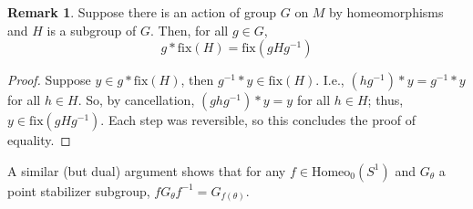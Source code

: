 \documentclass[10pt, oneside]{article}
\newcommand{\homeoS}{\text{Homeo}_0(S^1)}
\theoremstyle{definition}
\newtheorem{rem}{Remark}[section]
\theoremstyle{definition}
\begin{document}
\begin{rem}
    Suppose there is an action of group $G$ on $M$ by homeomorphisms and $H$ is a subgroup of $G$. Then, for all $g\in G$,
    $$g * \text{fix}(H) = \text{fix}(g H g^{-1})$$
\end{rem}
\begin{proof}
    Suppose $y\in g * \text{fix}(H)$, then $g^{-1}*y\in \text{fix}(H)$. I.e., $(hg^{-1})*y = g^{-1}*y$ for all $h\in H$. So, by cancellation, $(ghg^{-1})*y = y$ for all $h\in H$; thus, $y\in \text{fix}(g H g^{-1})$. Each step was reversible, so this concludes the proof of equality.
\end{proof}

A similar (but dual) argument shows that for any $f\in\homeoS$ and $G_\theta$ a point stabilizer subgroup, $f G_\theta f^{-1} = G_{f(\theta)}$.
\end{document}
